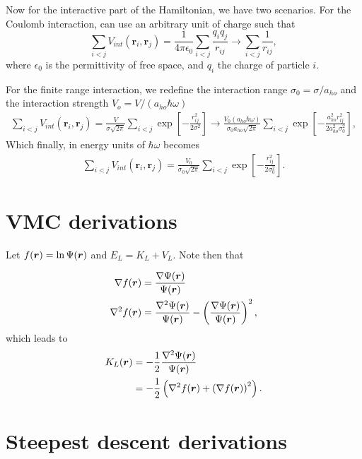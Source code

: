 Now for the interactive part of the Hamiltonian, we have two scenarios. For the Coulomb interaction, can use an arbitrary unit of charge such that 
 \begin{equation*}
    \sum_{i< j} V_{int}(\mathbf{r}_i, \mathbf{r}_j)= \frac{1}{4\pi \epsilon_0}\sum_{i < j} \frac{q_iq_j}{r_{ij}} \to \sum_{i < j} \frac{1}{r_{ij}},
\end{equation*}
where $\epsilon_0$ is the permittivity of free space, and $q_i$ the charge of particle $i$.

For the finite range interaction, we redefine the interaction range $\sigma_0 = \sigma/a_{ho}$ and the interaction strength $V_o = V/(a_{ho}\hbar\omega)$
\begin{align*}
    \sum_{i< j} V_{int}(\mathbf{r}_i, \mathbf{r}_j)= \frac{V}{\sigma \sqrt{2\pi}}\sum_{i< j} \exp\left[-\frac{r_{ij}^2}{2 \sigma^2}\right] \to \frac{V_0 (a_{ho}\hbar\omega)}{\sigma_0 a_{ho} \sqrt{2\pi}}\sum_{i< j} \exp\left[-\frac{a_{ho}^2 r_{ij}^2}{2 a_{ho}^2\sigma_0^2}\right],
\end{align*}
Which finally, in energy units of $\hbar \omega$ becomes
\begin{align*}
    \sum_{i< j} V_{int}(\mathbf{r}_i, \mathbf{r}_j)= \frac{V_0 }{\sigma_0 \sqrt{2\pi}}\sum_{i< j} \exp\left[-\frac{ r_{ij}^2}{2 \sigma_0^2}\right].
\end{align*}


\section{VMC derivations}\label{appendix:vmc}

Let $f(\boldsymbol{r})=\ln{\Psi}(\boldsymbol{r})$ and $E_L = K_L + V_L$. Note then that  

\begin{align}
    \nabla f(\boldsymbol{r}) &= \frac{\nabla \Psi(\boldsymbol{r})}{\Psi(\boldsymbol{r})} \\
    \nabla^2 f(\boldsymbol{r}) &=  \frac{\nabla^2 \Psi(\boldsymbol{r})}{\Psi(\boldsymbol{r})} - \left(  \frac{\nabla \Psi(\boldsymbol{r})}{\Psi(\boldsymbol{r})}\right)^2,
\end{align}
which leads to 
\begin{align}
    K_L(\boldsymbol{r}) &= -\frac{1}{2}\frac{ \nabla^2 \Psi(\boldsymbol{r})}{\Psi(\boldsymbol{r})} \\
    & = -\frac{1}{2} \left(\nabla^2 f(\boldsymbol{r}) +  \left( \nabla f(\boldsymbol{r})\right)^2 \right).
\end{align}



\section{Steepest descent derivations}\label{appendix:steepest}

